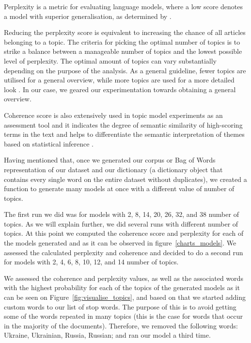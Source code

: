 \documentclass[twoside,12pt,a4paper]{article}
\begin{document}
Perplexity is a metric for evaluating language models, where a low score denotes a model with superior generalisation, as determined by \citep{asmussen_smart_2019, xu_probabilistic_2016, blei_correlated_2007, zhao_heuristic_2015}. 

Reducing the perplexity score is equivalent to increasing the chance of all articles belonging to a topic. The criteria for picking the optimal number of topics is to strike a balance between a manageable number of topics and the lowest possible level of perplexity. The optimal amount of topics can vary substantially depending on the purpose of the analysis. As a general guideline, fewer topics are utilised for a general overview, while more topics are used for a more detailed look \citep{asmussen_smart_2019}. In our case, we geared our experimentation towards obtaining a general overview.

Coherence score is also extensively used in topic model experiments as an assessment tool \citep{li_seeded-btm_2019, ferner_automated_2020, albalawi_using_2020, towne_measuring_2016} and it indicates the degree of semantic similarity of high-scoring terms in the text and helps to differentiate the semantic interpretation of themes based on statistical inference \citep{ray_review_2019}.  

Having mentioned that, once we generated our corpus or Bag of Words representation of our dataset and our dictionary (a dictionary object that contains every single word on the entire dataset without duplicates), we created a function to generate many models at once with a different value of number of topics.

The first run we did was for models with 2, 8, 14, 20, 26, 32, and 38 number of topics. As we will explain further, we did several runs with different number of topics. At this point we computed the coherence score and perplexity for each of the models generated and as it can be observed in figure~\ref{charts_models}. We assessed the calculated perplexity and coherence and decided to do a second run for models with 2, 4, 6, 8, 10, 12, and 14 number of topics. 

We assessed the coherence and perplexity values, as well as the associated words with the highest probability for each of the topics of the generated models as it can be seen on Figure~\ref{fig:visualise_topics}, and based on that we started adding custom words to our list of stop words. The purpose of this is to avoid getting some of the words repeated in many topics (this is the case for words that occur in the majority of the documents). Therefore, we removed the following words: Ukraine, Ukrainian, Russia, Russian; and ran our model a third time. 
\end{document}

